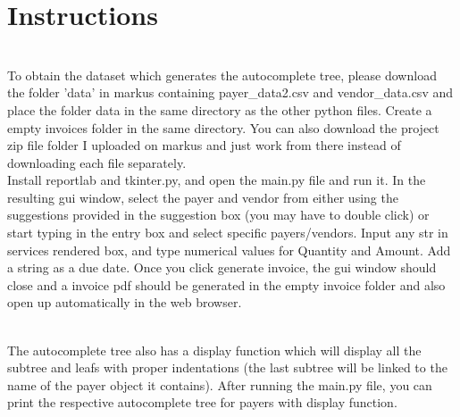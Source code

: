 \documentclass[fontsize=11pt]{article}
\begin{document}
    \section*{Instructions}
    \noindent
    \\
    To obtain the dataset which generates the autocomplete tree, please download the folder 'data' in markus containing payer\_data2.csv and vendor\_data.csv and place the folder data in the same directory as the other python files. Create a empty invoices folder in the same directory. You can also download the project zip file folder I uploaded on markus and just work from there instead of downloading each file separately.
    \\
    Install reportlab and tkinter.py, and open the main.py file and run it. In the resulting gui window, select the payer and vendor from either using the suggestions provided in the suggestion box (you may have to double click) or start typing in the entry box and select specific payers/vendors. Input any str in services rendered box, and type numerical values for Quantity and Amount. Add a string as a due date. Once you click generate invoice, the gui window should close and a invoice pdf should be generated in the empty invoice folder and also open up automatically in the web browser.

    \\
    The autocomplete tree also has a display function which will display all the subtree and leafs with proper indentations (the last subtree will be linked to the name of the payer object it contains). After running the main.py file, you can print the respective autocomplete tree for payers with display function.
\end{document}

